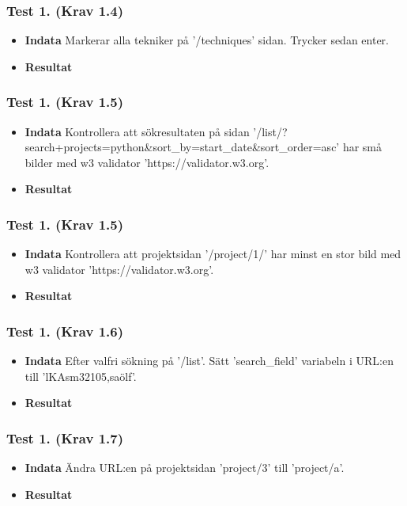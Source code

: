 \documentclass{TDP003mall}
\begin{document}
\subsubsection*{Test 1. (Krav 1.4)}
\begin{itemize}
\item[]\textbf{Indata} Markerar alla tekniker på '/techniques' sidan. Trycker sedan enter.
\item[]\textbf{Resultat} 
\end{itemize}
\subsubsection*{Test 1. (Krav 1.5)}
\begin{itemize}%
\item[]\textbf{Indata} Kontrollera att sökresultaten på sidan '/list/?search+projects=python\&sort\_by=start\_date\&sort\_order=asc' har små bilder med w3 validator 'https://validator.w3.org'.
\item[]\textbf{Resultat} 
\end{itemize}
\subsubsection*{Test 1. (Krav 1.5)}
\begin{itemize}%
\item[]\textbf{Indata} Kontrollera att projektsidan '/project/1/' har minst en stor bild med w3 validator 'https://validator.w3.org'.
\item[]\textbf{Resultat} 
\end{itemize}
\subsubsection*{Test 1. (Krav 1.6)}
\begin{itemize}
\item[]\textbf{Indata} Efter valfri sökning på '/list'. Sätt 'search\_field' variabeln i URL:en till 'lKAsm32105,saölf'.
\item[]\textbf{Resultat} 
\end{itemize}
\subsubsection*{Test 1. (Krav 1.7)}
\begin{itemize}
\item[]\textbf{Indata} Ändra URL:en på projektsidan 'project/3' till 'project/a'.
\item[]\textbf{Resultat} 
\end{itemize}
\end{document}
